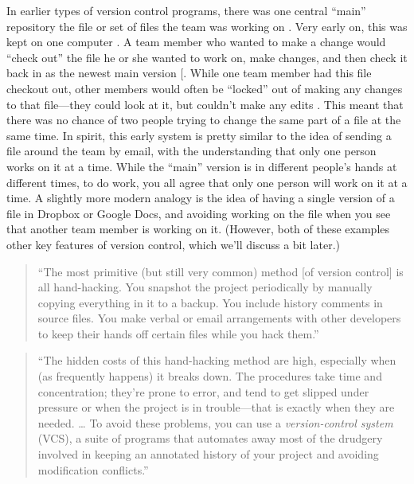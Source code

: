 \documentclass[]{tufte-book}
\begin{document}
In earlier types of version control programs, there was one central ``main''
repository the file or set of files the team was working on
\citep{raymondunderstanding, target2018version}. Very early on, this was kept on one
computer \citep{irving2011astonishments}. A team member who wanted to make a change
would ``check out'' the file he or she wanted to work on, make changes, and then
check it back in as the newest main version {[}\citet{raymond2003art}. While one team
member had this file checkout out, other members would often be ``locked'' out of
making any changes to that file---they could look at it, but couldn't make any
edits \citep{raymondunderstanding, target2018version}. This meant that there was no
chance of two people trying to change the same part of a file at the same time.
In spirit, this early system is pretty similar to the idea of sending a file
around the team by email, with the understanding that only one person works on
it at a time. While the ``main'' version is in different people's hands at
different times, to do work, you all agree that only one person will work on it
at a time. A slightly more modern analogy is the idea of having a single version
of a file in Dropbox or Google Docs, and avoiding working on the file when you
see that another team member is working on it. (However, both of these examples
other key features of version control, which we'll discuss a bit later.)

\begin{quote}
``The most primitive (but still very common) method {[}of version control{]} is all
hand-hacking. You snapshot the project periodically by manually copying everything
in it to a backup. You include history comments in source files. You make verbal
or email arrangements with other developers to keep their hands off certain files
while you hack them.'' \citep{raymond2003art}
\end{quote}

\begin{quote}
``The hidden costs of this hand-hacking method are high, especially when (as
frequently happens) it breaks down. The procedures take time and concentration;
they're prone to error, and tend to get slipped under pressure or when the project
is in trouble---that is exactly when they are needed. \ldots{} To avoid these problems,
you can use a \emph{version-control system} (VCS), a suite of programs that
automates away most of the drudgery involved in keeping an annotated history of
your project and avoiding modification conflicts.'' \citep{raymond2003art}
\end{quote}
\end{document}
